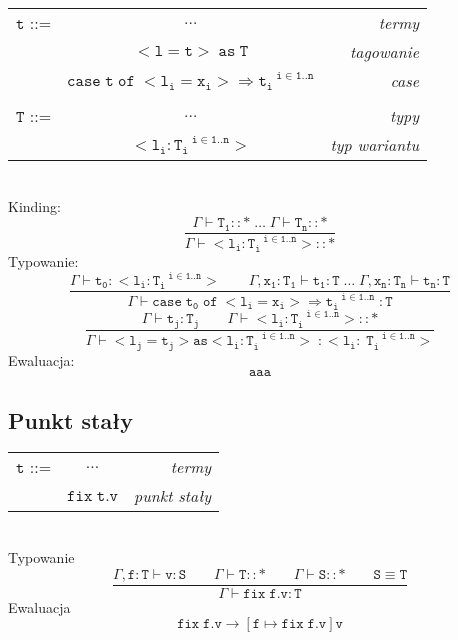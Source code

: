 \documentclass[11pt,leqno]{article}
\begin{document}
\begin{tabular}{| l c r |}
  \hline
  $\mathtt{t}$ ::= & $\dots$ & \textit{termy}  \\
   & $\mathtt{<l=t>\;as\;T}$ & \textit{tagowanie} \\
   & $\mathtt{case\;t\;of\;<l_i=x_i>\Rightarrow t_i^{\;\;\;i \in 1..n}}$ & \textit{case}\\
   & & \\
  $\mathtt{T}$ ::= & $\dots$ & \textit{typy}  \\
   & $\mathtt{<l_i:T_i^{\;\;\;i \in 1..n}>}$ & \textit{typ wariantu}\\
  \hline
\end{tabular} \\
Kinding:
 	\[\mathtt{
             \frac{\Gamma \vdash T_1::\ast \;\dots\;\Gamma \vdash T_n::\ast}{\Gamma \vdash <l_i:T_i^{\;\;\;i \in 1..n}>::\ast}
		}
	\]
Typowanie:
 	\[\mathtt{ \frac{\Gamma \vdash t_0:<l_i:T_i^{\;\;\;i \in 1..n}> \hspace{2em} \Gamma,x_1:T_1 \vdash t_1:T \;\dots\; \Gamma,x_n:T_n \vdash t_n:T}{\Gamma \vdash case\;t_0\;of\;<l_i=x_i>\Rightarrow t_i^{\;\;\;i \in 1..n}\; : T}
		}
	\]
 	\[\mathtt{ \frac{\Gamma \vdash t_j : T_j \hspace{2em} \Gamma \vdash <l_i:T_i^{\;\;\;i \in 1..n}>::\ast}{\Gamma \vdash <l_j=t_j> as <l_i:T_i^{\;\;\;i \in 1..n}> \;: <l_i:\;T_i^{\;\;\;i \in 1..n}>}
		}
	\]
Ewaluacja:
 	\[\mathtt{ aaa
		}
	\]

\subsection{Punkt stały}

\begin{tabular}{| l c r |}
  \hline
  $\mathtt{t}$ ::= & $\dots$ & \textit{termy}  \\
   & $\mathtt{fix \;t.v}$ & \textit{punkt stały}\\
  \hline
\end{tabular} \\

Typowanie \\
 	\[\mathtt{\frac{\Gamma, f:T \vdash v:S \hspace{2em} \Gamma \vdash T::\ast\hspace{2em} \Gamma \vdash S::\ast \hspace{2em} S\equiv T}{\Gamma \vdash fix\;f.v:T}}
	\]
Ewaluacja \\
 	\[\mathtt{ fix\;f.v \longrightarrow [f \mapsto fix\;f.v]v
		}
	\]
\end{document}
